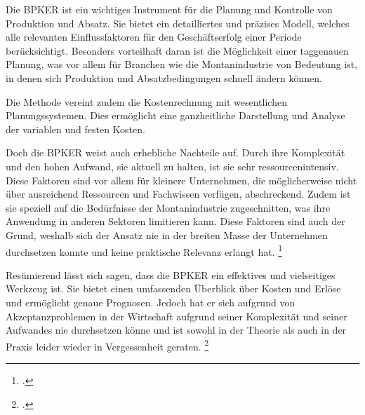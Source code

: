 
Die BPKER ist ein wichtiges Instrument für die Planung und Kontrolle von Produktion und Absatz. Sie bietet ein detailliertes und präzises Modell, welches alle relevanten Einflussfaktoren für den Geschäftserfolg einer Periode berücksichtigt. Besonders vorteilhaft daran ist die Möglichkeit einer taggenauen Planung, was vor allem für Branchen wie die Montanindustrie von Bedeutung ist, in denen sich Produktion und Absatzbedingungen schnell ändern können.

Die Methode vereint zudem die Kostenrechnung mit wesentlichen Planungssystemen. Dies ermöglicht eine ganzheitliche Darstellung und Analyse der variablen und festen Kosten.

Doch die BPKER weist auch erhebliche Nachteile auf. Durch ihre Komplexität und den hohen Aufwand, sie aktuell zu halten, ist sie sehr ressourcenintensiv. Diese Faktoren sind vor allem für kleinere Unternehmen, die möglicherweise nicht über ausreichend Ressourcen und Fachwissen verfügen, abschreckend. Zudem ist sie speziell auf die Bedürfnisse der Montanindustrie zugeschnitten, was ihre Anwendung in anderen Sektoren limitieren kann. Diese Faktoren sind auch der Grund, weshalb sich der Ansatz nie in der breiten Masse der Unternehmen durchsetzen konnte und keine praktische Relevanz erlangt hat. \footcite[Vgl.][(S. 292ff)]{franz2001beitrag}

Resümierend lässt sich sagen, dass die BPKER ein effektives und vielseitiges Werkzeug ist. Sie bietet einen umfassenden Überblick über Kosten und Erlöse und ermöglicht genaue Prognosen. Jedoch hat er sich aufgrund von Akzeptanzproblemen in der Wirtschaft aufgrund seiner Komplexität und seiner Aufwandes nie durchsetzen könne und ist sowohl in der Theorie als auch in der Praxis leider wieder in Vergessenheit geraten. \footcite[Vgl.][(S. 292ff)]{franz2001beitrag}



